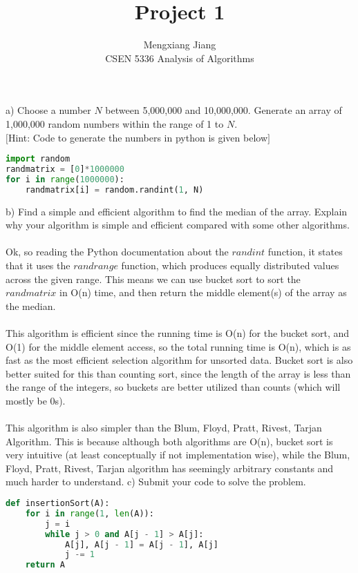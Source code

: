 \documentclass[12pt]{article}
\newenvironment{problem}[2][Problem]{\begin{trivlist}
\item[\hskip \labelsep {\bfseries #1}\hskip \labelsep {\bfseries #2.}]}{\end{trivlist}}
\begin{document}
 
 
\title{Project 1}%
\author{Mengxiang Jiang\\ %
CSEN 5336 Analysis of Algorithms} %
 
\maketitle
 
\begin{problem}{1} %
a) Choose a number $N$ between 5,000,000 and 10,000,000. Generate an array of 1,000,000 random numbers within the range of 1 to $N$.\\
$[$Hint: Code to generate the numbers in python is given below$]$
\begin{lstlisting}[language=Python, caption=Generate Array with Random Integers]
import random
randmatrix = [0]*1000000
for i in range(1000000):
    randmatrix[i] = random.randint(1, N)
\end{lstlisting}
b) Find a simple and efficient algorithm to find the median of the array. Explain why your algorithm is simple and efficient compared with some other algorithms.\\\\
Ok, so reading the Python documentation about the $randint$ function, it states that it uses the $randrange$ function, which produces equally distributed values across the given range. 
This means we can use bucket sort to sort the $randmatrix$ in O(n) time,
and then return the middle element(s) of the array as the median.\\\\
This algorithm is efficient since the running time is O(n) for the bucket sort, and O(1) for the middle element access,
so the total running time is O(n), which is as fast as the most efficient selection algorithm for unsorted data.
Bucket sort is also better suited for this than counting sort, since the length of the array is less than the range of the integers,
so buckets are better utilized than counts (which will mostly be 0s).\\\\
This algorithm is also simpler than the Blum, Floyd, Pratt, Rivest, Tarjan Algorithm.
This is because although both algorithms are O(n), bucket sort is very intuitive (at least conceptually if not implementation wise),
while the Blum, Floyd, Pratt, Rivest, Tarjan algorithm has seemingly arbitrary constants and much harder to understand.
\clearpage
c) Submit your code to solve the problem.
\begin{lstlisting}[language=Python, caption=Find Median of a Random Array]
def insertionSort(A):
    for i in range(1, len(A)):
        j = i
        while j > 0 and A[j - 1] > A[j]:
            A[j], A[j - 1] = A[j - 1], A[j]
            j -= 1
    return A


\end{lstlisting}
\end{problem}
\end{document}
